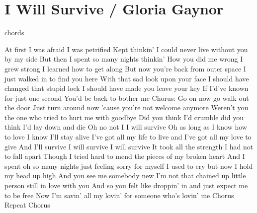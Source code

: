 \section{I Will Survive / Gloria Gaynor}\label{sec:i_will_survive}
  {\small chords}
  
  \Dminor
  \Gseven
  \CmajorSeven
  \FmajorSeven
  \EsevenSusFour
  \Eseven
  
   At first I was afraid I was  petrified
  Kept thinkin'  I could never live without you  by my side
  But then I  spent so many nights thinkin'
   How you did me wrong
  I grew  strong I learned  how to get along
  But now you're  back
  from outer  space
  I just walked  in to find you here
  With that sad  look upon your face
  I should have  changed that stupid lock
  I should have  made you leave your key
  If I'd've  known for just one second
  You'd be  back to bother me
  Chorus:
  Go on now  go
  walk out the  door
  Just turn around now 'cause you're not  welcome anymore
   Weren't you the one who tried to  hurt me with goodbye
  Did you think I’d  crumble did you think I'd  lay down and die
  Oh no not  I I will survive
  Oh as  long as I know how to love I  know I'll stay alive
  I've got  all my life to live and I've got  all my love to give
  And I'll survive I will survive
  I will survive       
  It took  all the strength I had not to  fall apart
  Though I tried  hard to mend the pieces of my  broken heart
  And I spent  oh so many nights just feeling  sorry for myself
  I used to  cry but now I  hold my head up high
  And you see  me somebody  new
  I'm not that  chained up little person still in  love with you
  And so you  felt like droppin' in and just expect me to be free
  Now I'm  savin' all my lovin' for someone who's lovin' me
  Chorus
  Repeat Chorus
